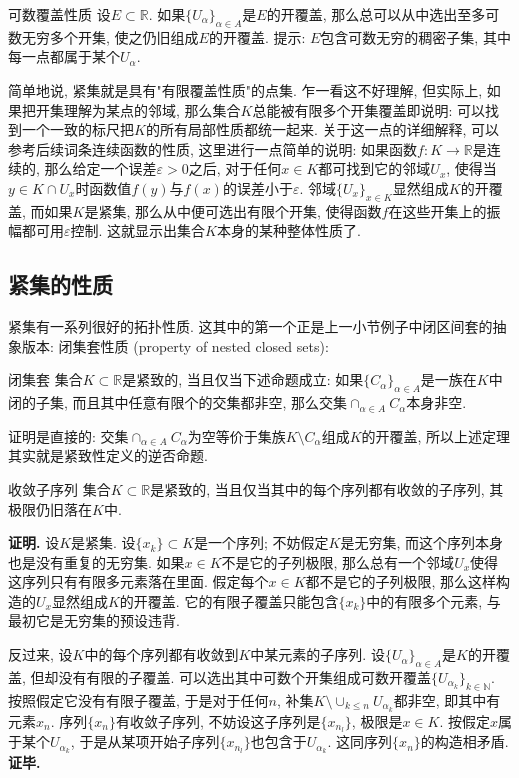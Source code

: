 \begin{exercise}{可数覆盖性质}
设$E\subset\mathbb{R}$. 如果$\{U_\alpha\}_{\alpha\in A}$是$E$的开覆盖, 那么总可以从中选出至多可数无穷多个开集, 使之仍旧组成$E$的开覆盖. 提示: $E$包含可数无穷的稠密子集, 其中每一点都属于某个$U_\alpha$.
\end{exercise}

简单地说, 紧集就是具有"有限覆盖性质"的点集. 乍一看这不好理解, 但实际上, 如果把开集理解为某点的邻域, 那么集合$K$总能被有限多个开集覆盖即说明: 可以找到一个一致的标尺把$K$的所有局部性质都统一起来. 关于这一点的详细解释, 可以参考后续词条连续函数的性质, 这里进行一点简单的说明: 如果函数$f:K\to\mathbb{R}$是连续的, 那么给定一个误差$\varepsilon>0$之后, 对于任何$x\in K$都可找到它的邻域$U_{x}$, 使得当$y\in K\cap U_x$时函数值$f(y)$与$f(x)$的误差小于$\varepsilon$. 邻域$\{U_x\}_{x\in K}$显然组成$K$的开覆盖, 而如果$K$是紧集, 那么从中便可选出有限个开集, 使得函数$f$在这些开集上的振幅都可用$\varepsilon$控制. 这就显示出集合$K$本身的某种整体性质了.

\subsection{紧集的性质}
紧集有一系列很好的拓扑性质. 这其中的第一个正是上一小节例子中闭区间套的抽象版本: 闭集套性质 (property of nested closed sets):

\begin{theorem}{闭集套}
集合$K\subset\mathbb{R}$是紧致的, 当且仅当下述命题成立: 如果$\{C_\alpha\}_{\alpha\in A}$是一族在$K$中闭的子集, 而且其中任意有限个的交集都非空, 那么交集$\cap_{\alpha\in A}C_\alpha$本身非空. 
\end{theorem}

证明是直接的: 交集$\cap_{\alpha\in A}C_\alpha$为空等价于集族$K\setminus C_\alpha$组成$K$的开覆盖, 所以上述定理其实就是紧致性定义的逆否命题.

\begin{theorem}{收敛子序列}
集合$K\subset\mathbb{R}$是紧致的, 当且仅当其中的每个序列都有收敛的子序列, 其极限仍旧落在$K$中.
\end{theorem}

\textbf{证明.} 设$K$是紧集. 设$\{x_k\}\subset K$是一个序列; 不妨假定$K$是无穷集, 而这个序列本身也是没有重复的无穷集. 如果$x\in K$不是它的子列极限, 那么总有一个邻域$U_x$使得这序列只有有限多元素落在里面. 假定每个$x\in K$都不是它的子列极限, 那么这样构造的$U_x$显然组成$K$的开覆盖. 它的有限子覆盖只能包含$\{x_k\}$中的有限多个元素, 与最初它是无穷集的预设违背.

反过来, 设$K$中的每个序列都有收敛到$K$中某元素的子序列. 设$\{U_\alpha\}_{\alpha\in A}$是$K$的开覆盖, 但却没有有限的子覆盖. 可以选出其中可数个开集组成可数开覆盖$\{U_{\alpha_k}\}_{k\in\mathbb{N}}$. 按照假定它没有有限子覆盖, 于是对于任何$n$, 补集$K\setminus\cup_{k\leq n}U_{\alpha_k}$都非空, 即其中有元素$x_n$. 序列$\{x_n\}$有收敛子序列, 不妨设这子序列是$\{x_{n_l}\}$, 极限是$x\in K$. 按假定$x$属于某个$U_{\alpha_k}$, 于是从某项开始子序列$\{x_{n_l}\}$也包含于$U_{\alpha_k}$. 这同序列$\{x_n\}$的构造相矛盾. \textbf{证毕.}


